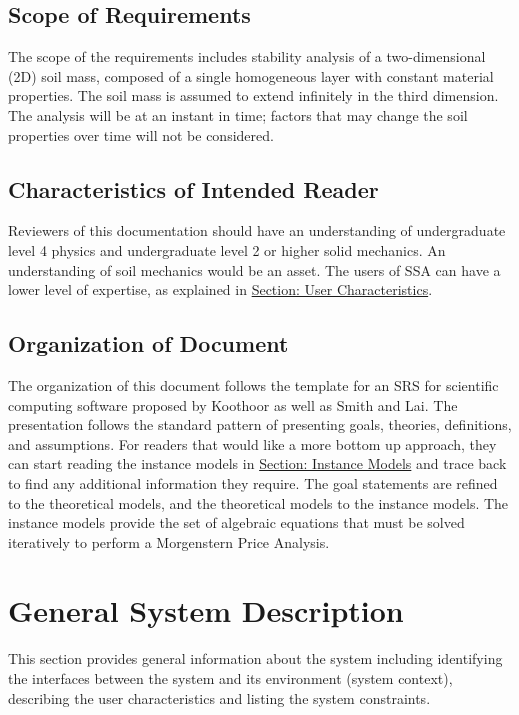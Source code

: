 \documentclass[12pt]{article}
\begin{document}
\subsection{Scope of Requirements}
\label{Sec:ReqsScope}
The scope of the requirements includes stability analysis of a two-dimensional (2D) soil mass, composed of a single homogeneous layer with constant material properties. The soil mass is assumed to extend infinitely in the third dimension. The analysis will be at an instant in time; factors that may change the soil properties over time will not be considered.
\subsection{Characteristics of Intended Reader}
\label{Sec:ReaderChars}
Reviewers of this documentation should have an understanding of undergraduate level 4 physics and undergraduate level 2 or higher solid mechanics. An understanding of soil mechanics would be an asset. The users of SSA can have a lower level of expertise, as explained in \hyperref[Sec:UserChars]{Section: User Characteristics}.
\subsection{Organization of Document}
\label{Sec:DocOrg}
The organization of this document follows the template for an SRS for scientific computing software proposed by Koothoor as well as Smith and Lai. The presentation follows the standard pattern of presenting goals, theories, definitions, and assumptions. For readers that would like a more bottom up approach, they can start reading the instance models in \hyperref[Sec:IMs]{Section: Instance Models} and trace back to find any additional information they require.
The goal statements are refined to the theoretical models, and the theoretical models to the instance models. The instance models provide the set of algebraic equations that must be solved iteratively to perform a Morgenstern Price Analysis.
\section{General System Description}
\label{Sec:GenSysDesc}
This section provides general information about the system including identifying the interfaces between the system and its environment (system context), describing the user characteristics and listing the system constraints.
\end{document}
